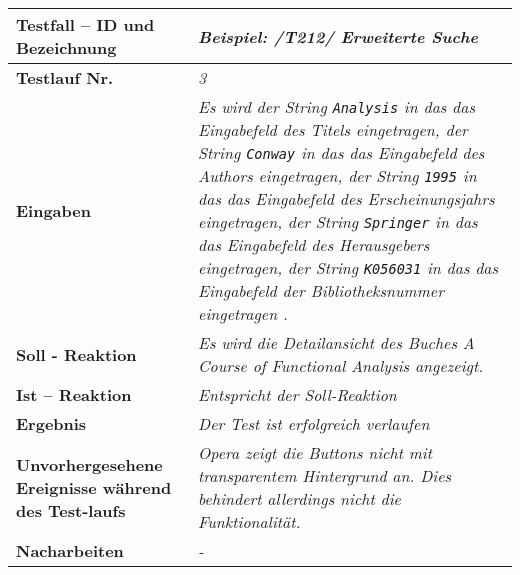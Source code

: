 \begin{longtable}{|p{5cm}|p{10cm}|}
\hline
\textbf{Testfall -- ID und Bezeichnung} & \textit{Beispiel: /T212/ Erweiterte
Suche} \\
\hline
\textbf{Testlauf Nr.} & \textit{3} \\
\hline
\textbf{Eingaben} & \textit{Es wird 
der String \lstinline{Analysis} in das das Eingabefeld des Titels eingetragen,
der String \lstinline{Conway} in das das Eingabefeld des Authors eingetragen,
der String \lstinline{1995} in das das Eingabefeld des Erscheinungsjahrs
eingetragen,
der String \lstinline{Springer} in das das Eingabefeld des Herausgebers
eingetragen,
der String \lstinline{K056031} in das das Eingabefeld der Bibliotheksnummer eingetragen
.} \\
\hline
\textbf{Soll - Reaktion} & \textit{Es wird die Detailansicht des Buches \emph{A
Course of Functional Analysis} angezeigt.} \\
\hline
\textbf{Ist -- Reaktion} & \textit{Entspricht der Soll-Reaktion} \\
\hline
\textbf{Ergebnis} & \textit{Der Test ist erfolgreich verlaufen} \\
\hline
\textbf{Unvorhergesehene Ereignisse w\"ahrend des Test-laufs } &
\textit{Opera zeigt die Buttons nicht mit transparentem Hintergrund an. Dies
behindert allerdings nicht die Funktionalität.} \\
\hline
\textbf{Nacharbeiten } & \textit{-} \\
\hline
\end{longtable}
